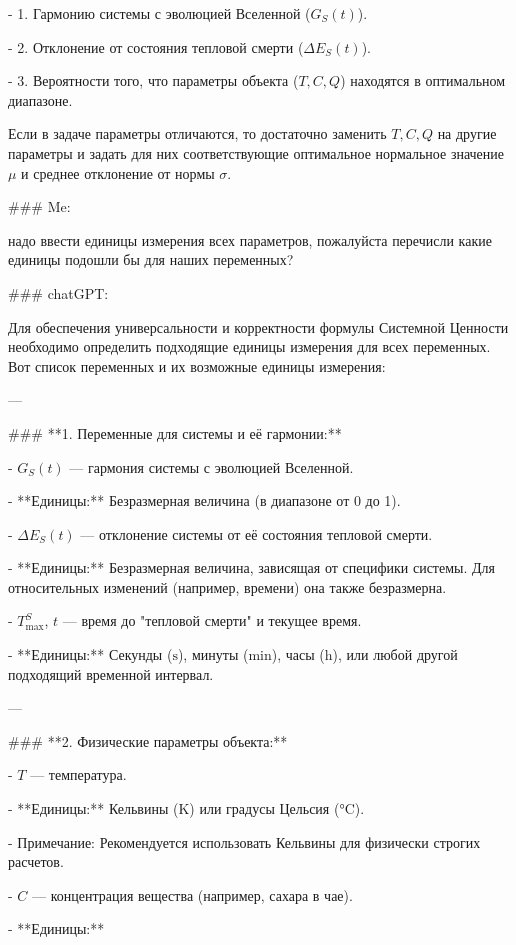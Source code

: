 - 1. Гармонию системы с эволюцией Вселенной (\( G_S(t) \)).

- 2. Отклонение от состояния тепловой смерти (\( \Delta E_S(t) \)).

- 3. Вероятности того, что параметры объекта (\( T, C, Q \)) находятся в оптимальном диапазоне.


Если в задаче параметры отличаются, то достаточно заменить \( T, C, Q \) на другие параметры и задать для них соответствующие оптимальное нормальное значение \( \mu \) и среднее отклонение от нормы \( \sigma \).


### Me:

надо ввести единицы измерения всех параметров, пожалуйста перечисли какие единицы подошли бы для наших переменных?

### chatGPT:

Для обеспечения универсальности и корректности формулы Системной Ценности необходимо определить подходящие единицы измерения для всех переменных. Вот список переменных и их возможные единицы измерения:


---


### **1. Переменные для системы и её гармонии:**

- \( G_S(t) \) — гармония системы с эволюцией Вселенной.

  - **Единицы:** Безразмерная величина (в диапазоне от 0 до 1).


- \( \Delta E_S(t) \) — отклонение системы от её состояния тепловой смерти.

  - **Единицы:** Безразмерная величина, зависящая от специфики системы. Для относительных изменений (например, времени) она также безразмерна.


- \( T_{\text{max}}^S \), \( t \) — время до "тепловой смерти" и текущее время.

  - **Единицы:** Секунды (\( \text{s} \)), минуты (\( \text{min} \)), часы (\( \text{h} \)), или любой другой подходящий временной интервал.


---


### **2. Физические параметры объекта:**

- \( T \) — температура.

  - **Единицы:** Кельвины (\( \text{K} \)) или градусы Цельсия (\(° \text {C} \)).

  - Примечание: Рекомендуется использовать Кельвины для физически строгих расчетов.


- \( C \) — концентрация вещества (например, сахара в чае).

  - **Единицы:** 

